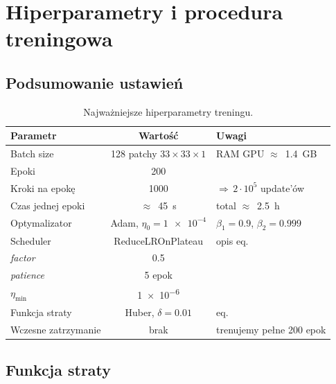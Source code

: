 \documentclass[11pt]{article}
\begin{document}


\newpage
\section{Hiperparametry i procedura treningowa}
\label{sec:train}

\subsection{Podsumowanie ustawień}

\begin{table}[h]
\centering
\begin{tabular}{@{}lcl@{}}
\toprule
\textbf{Parametr} & \textbf{Wartość} & \textbf{Uwagi} \\ \midrule

Batch size                & 128 patchy $33{\times}33{\times}1$ & RAM GPU $\approx$~\SI{1.4}{GB} \\
Epoki                     & 200 & \\
Kroki na epokę            & 1000 & $\Rightarrow\,2{\cdot}10^{5}$ update’ów \\
Czas jednej epoki         & $\approx$~\SI{45}{s} & total $\approx$~\SI{2.5}{h} \\[4pt]

Optymalizator             & Adam, $\eta_0 = \num{1e-4}$ & $\beta_1{=}0.9$, $\beta_2{=}0.999$ \\
Scheduler                 & \textsf{ReduceLROnPlateau} & opis eq. \\
\quad \textit{factor}     & 0.5 & \\
\quad \textit{patience}   & 5 epok & \\
\quad $\eta_{\text{min}}$ & \num{1e-6} & \\[4pt]

Funkcja straty            & Huber, $\delta = 0.01$ & eq. \\
Wczesne zatrzymanie       & brak & trenujemy pełne 200 epok \\

\bottomrule
\end{tabular}
\caption{Najważniejsze hiperparametry treningu.}
\label{tab:hparams}
\end{table}

\subsection{Funkcja straty}
\end{document}
